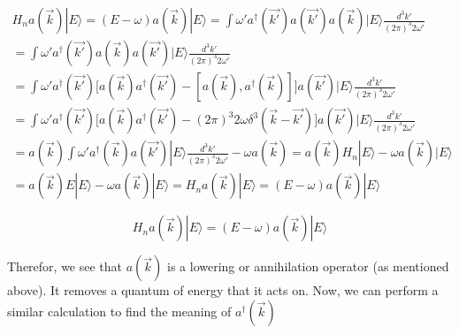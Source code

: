 \documentclass{article}
\begin{document}
    \begin{equation}
        \begin{aligned}
            H_{n} a(\vec{k}) | E \rangle = (E - \omega) a(\vec{k}) | E \rangle = \int \omega' a^{\dag} (\vec{k'}) a (\vec{k'}) a (\vec{k}) | E \rangle \frac{d^{3} k'}{(2 \pi)^{3} 2 \omega'} \\
            = \int \omega' a^{\dag} (\vec{k'}) a (\vec{k}) a (\vec{k'}) | E \rangle \frac{d^{3} k'}{(2 \pi)^{3} 2 \omega'} \\
            = \int \omega' a^{\dag} (\vec{k'}) \big[a (\vec{k}) a^{\dag} (\vec{k'}) - [a (\vec{k}), a^{\dag} (\vec{k})] \big] a (\vec{k'}) | E \rangle \frac{d^{3} k'}{(2 \pi)^{3} 2 \omega'} \\
            = \int \omega' a^{\dag} (\vec{k'}) \big[a (\vec{k}) a^{\dag} (\vec{k'}) - (2 \pi)^3 2 \omega \delta^{3} (\vec{k} - \vec{k'}) \big] a (\vec{k'}) | E \rangle \frac{d^{3} k'}{(2 \pi)^{3} 2 \omega'} \\
            = a (\vec{k}) \int \omega' a^{\dag} (\vec{k}) a (\vec{k'}) | E \rangle \frac{d^{3} k'}{(2 \pi)^{3} 2 \omega'} - \omega a (\vec{k}) = a (\vec{k}) H_{n} | E \rangle - \omega a (\vec{k}) | E \rangle \\
            = a (\vec{k}) E | E \rangle - \omega a (\vec{k}) | E \rangle = H_{n} a(\vec{k}) | E \rangle = (E - \omega) a(\vec{k}) | E \rangle
        \end{aligned}
    \end{equation}

    \begin{framed}
        \begin{equation}
            H_{n} a(\vec{k}) | E \rangle = (E - \omega) a(\vec{k}) | E \rangle
        \end{equation}
    \end{framed}

    Therefor, we see that $a(\vec{k})$ is a lowering or annihilation operator (as mentioned above). It removes a quantum of energy that it acts on.
    Now, we can perform a similar calculation to find the meaning of $a^{\dag}(\vec{k})$
\end{document}

